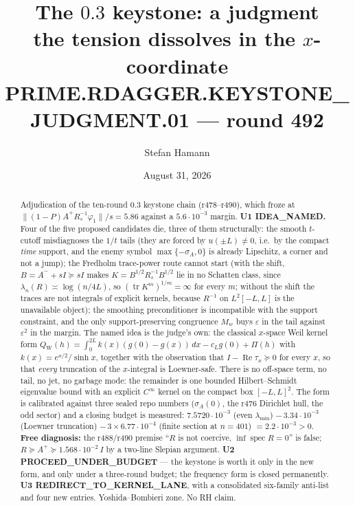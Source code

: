 \documentclass[11pt]{article}
\title{\bfseries The $0.3$ keystone: a judgment\\[2mm]
\large the tension dissolves in the $x$-coordinate\\[2mm]
\large PRIME.RDAGGER.KEYSTONE\_JUDGMENT.01 --- round 492}
\author{Stefan Hamann}
\date{August 31, 2026}
\theoremstyle{remark}
\newcommand{\QW}{Q_{\mathrm W}}
\begin{document}
\maketitle

\begin{abstract}\noindent
Adjudication of the ten-round $0.3$ keystone chain
(r478--r490), which froze at
$\|(1-P)A^+R_s^{-1}\varphi_1\|/s=5.86$ against a
$5.6\cdot10^{-3}$ margin.
\textbf{U1 IDEA\_NAMED.}
Four of the five proposed candidates die, three of them
structurally: the smooth $t$-cutoff misdiagnoses the
$1/t$ tails (they are forced by $u(\pm L)\neq0$, i.e.\ by
the compact \emph{time} support, and the enemy symbol
$\max\{-\sigma_A,0\}$ is already Lipschitz, a corner and
not a jump); the Fredholm trace-power route cannot start
(with the shift, $B=A^-+sI\succeq sI$ makes
$K=B^{1/2}R_s^{-1}B^{1/2}$ lie in no Schatten class,
since $\lambda_n(R)\asymp\log(n/4L)$, so
$(\operatorname{tr}K^m)^{1/m}=\infty$ for every $m$; without
the shift the traces are not integrals of explicit kernels,
because $R^{-1}$ on $L^2[-L,L]$ is the unavailable object);
the smoothing preconditioner is incompatible with the support
constraint, and the only support-preserving congruence $M_w$
buys $\varepsilon$ in the tail against $\varepsilon^2$ in the
margin.  The named idea is the judge's own: the classical
$x$-space Weil kernel form
$\QW(h)=\int_0^{2L}k(x)(g(0)-g(x))\,dx-c_Lg(0)+\Pi(h)$
with $k(x)=e^{x/2}/\sinh x$, together with the observation
that $I-\operatorname{Re}\tau_x\succeq0$ for every $x$, so that
\emph{every} truncation of the $x$-integral is Loewner-safe.
There is no off-space term, no tail, no jet, no garbage mode:
the remainder is one bounded Hilbert--Schmidt eigenvalue bound
with an explicit $C^\infty$ kernel on the compact box
$[-L,L]^2$.  The form is calibrated against three sealed
repo numbers ($\sigma_A(0)$, the r476 Dirichlet hull, the
odd sector) and a closing budget is measured:
$7.5720\cdot10^{-3}$ (even $\lambda_{\min}$)
$-\,3.34\cdot10^{-3}$ (Loewner truncation)
$-\,3\times6.77\cdot10^{-4}$ (finite section at $n=401$)
$=2.2\cdot10^{-3}>0$.
\textbf{Free diagnosis:} the r488/r490 premise
``$R$ is not coercive, $\inf\operatorname{spec}R=0$'' is false;
$R\succeq A^+\succeq1.568\cdot10^{-2}\,I$ by a two-line
Slepian argument.
\textbf{U2 PROCEED\_UNDER\_BUDGET} --- the keystone is worth
it only in the new form, and only under a three-round budget;
the frequency form is closed permanently.
\textbf{U3 REDIRECT\_TO\_KERNEL\_LANE}, with a consolidated
six-family anti-list and four new entries.
Yoshida--Bombieri zone.  No RH claim.
\end{abstract}
\end{document}
